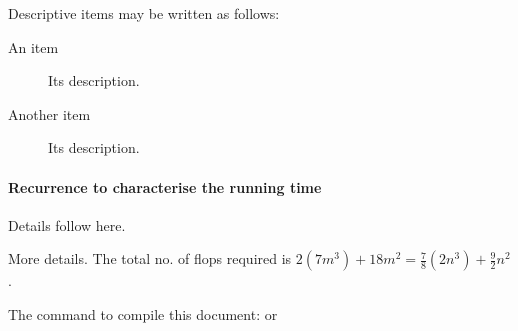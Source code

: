 \documentclass[a4paper,11pt]{article}
\begin{document}
\begin{enumerate}
\end{enumerate}

Descriptive items may be written as follows:
\begin{description}
  \item[An item]
     Its description.
  \item[Another item]
     Its description.
\end{description}

\paragraph{Recurrence to characterise the running time}
Details follow here.

More details.
The total no. of flops required is
 $2(7m^3) + 18m^2 = \frac{7}{8}(2n^3) + \frac{9}{2}n^2$.

The command to compile this document:
 or 
\end{document}
